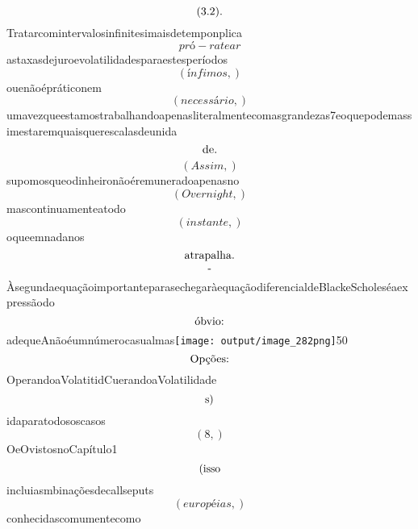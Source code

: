 \documentclass{article}
\begin{document}
\begin{equation}
$(3.2).$
\end{equation}Tratarcomintervalosinfinitesimaisdetemponplica\begin{equation}
pró - ratear
\end{equation}astaxasdejuroevolatilidadesparaestesperíodos\begin{equation}
\left( ínfimos,\right)
\end{equation}ouenãoépráticonem\begin{equation}
\left( necessário,\right)
\end{equation}umavezqueestamostrabalhandoapenasliteralmentecomasgrandezas7eoquepodemassimestaremquaisquerescalasdeunida\begin{equation}
$de.$
\end{equation}\begin{equation}
\left( Assim,\right)
\end{equation}supomosqueodinheironãoéremuneradoapenasno\begin{equation}
\left( Overnight,\right)
\end{equation}mascontinuamenteatodo\begin{equation}
\left( instante,\right)
\end{equation}oqueemnadanos\begin{equation}
$atrapalha.$
\end{equation}\begin{equation}
$-$
\end{equation}ÀsegundaequaçãoimportanteparasechegaràequaçãodiferencialdeBlackeScholeséaexpressãodo\begin{equation}
$óbvio:$
\end{equation}adequeAnãoéumnúmerocasualmas\texttt{[image: output/image\_282png]}50\begin{equation}
$Opções:$
\end{equation}OperandoaVolatitidCuerandoaVolatilidade\begin{equation}
$s)$
\end{equation}idaparatodososcasos\begin{equation}
\left( 8,\right)
\end{equation}OeOvistosnoCapítulo1\begin{equation}
$(isso$
\end{equation}incluiasmbinaçõesdecallseputs\begin{equation}
\left( européias,\right)
\end{equation}conhecidascomumentecomo\begin{equation}

\end{equation}
\end{document}
